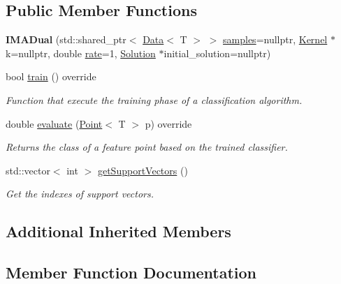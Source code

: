 \subsection*{Public Member Functions}
\begin{DoxyCompactItemize}
\item 
{\bfseries I\+M\+A\+Dual} (std\+::shared\+\_\+ptr$<$ \hyperlink{class_data}{Data}$<$ T $>$ $>$ \hyperlink{class_classifier_a0000b47a2e0784ada4c52d7046c4adb8}{samples}=nullptr, \hyperlink{class_kernel}{Kernel} $\ast$k=nullptr, double \hyperlink{class_classifier_a7b1c4ef87631bd9e46682e5bc4315111}{rate}=1, \hyperlink{class_solution}{Solution} $\ast$initial\+\_\+solution=nullptr)\hypertarget{class_i_m_a_dual_a22a5cf72fe88fd8bb846cf1b5758d61c}{}\label{class_i_m_a_dual_a22a5cf72fe88fd8bb846cf1b5758d61c}

\item 
bool \hyperlink{class_i_m_a_dual_aff820af6454ceeef4d23af48476d7218}{train} () override
\begin{DoxyCompactList}\small\item\em Function that execute the training phase of a classification algorithm. \end{DoxyCompactList}\item 
double \hyperlink{class_i_m_a_dual_af67dfc75554d055cfdf761ee940243d7}{evaluate} (\hyperlink{class_point}{Point}$<$ T $>$ p) override
\begin{DoxyCompactList}\small\item\em Returns the class of a feature point based on the trained classifier. \end{DoxyCompactList}\item 
std\+::vector$<$ int $>$ \hyperlink{class_i_m_a_dual_aa8e4e1d6e34c2e67d752c6b5f111ce35}{get\+Support\+Vectors} ()
\begin{DoxyCompactList}\small\item\em Get the indexes of support vectors. \end{DoxyCompactList}\end{DoxyCompactItemize}
\subsection*{Additional Inherited Members}


\subsection{Member Function Documentation}
